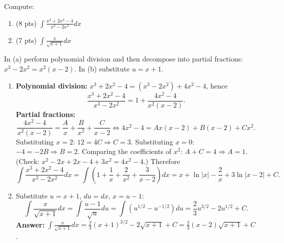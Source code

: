 
\begin{question}
Compute:
\begin{enumerate}
  \item[(a)] (8 pts) $\displaystyle\int\frac{x^3+2x^2-4}{x^3-2x^2}dx$
  \item[(b)] (7 pts) $\displaystyle\int\frac{x}{\sqrt{x+1}}dx$
\end{enumerate}
\end{question}

\begin{hint}
In (a) perform polynomial division and then decompose into partial fractions: $x^3-2x^2=x^2(x-2)$. In (b) substitute $u=x+1$.
\end{hint}

\begin{solution}
\begin{enumerate}
  \item[(a)] \textbf{Polynomial division:} $x^3+2x^2-4=(x^3-2x^2)+4x^2-4$, hence
  \[
  \frac{x^3+2x^2-4}{x^3-2x^2}=1+\frac{4x^2-4}{x^2(x-2)}.
  \]
  \textbf{Partial fractions:}
  \[
  \frac{4x^2-4}{x^2(x-2)}=\frac Ax+\frac B{x^2}+\frac C{x-2}\iff 4x^2-4=Ax(x-2)+B(x-2)+Cx^2.
  \]
  Substituting $x=2$: $12=4C\Rightarrow C=3$. Substituting $x=0$: $-4=-2B\Rightarrow B=2$. Comparing the coefficients of $x^2$: $A+C=4\Rightarrow A=1$.
  (Check: $x^2-2x+2x-4+3x^2=4x^2-4$.) Therefore
  \[
  \int\frac{x^3+2x^2-4}{x^3-2x^2}dx=\int\left(1+\frac1x+\frac2{x^2}+\frac3{x-2}\right)dx=x+\ln|x|-\frac2x+3\ln|x-2|+C.
  \]

  \item[(b)] Substitute $u=x+1$, $du=dx$, $x=u-1$:
  \[
  \int\frac{x}{\sqrt{x+1}}dx=\int\frac{u-1}{\sqrt u}du=\int\left(u^{1/2}-u^{-1/2}\right)du=\frac23u^{3/2}-2u^{1/2}+C.
  \]
  \textbf{Answer:} $\displaystyle\int\frac{x}{\sqrt{x+1}}dx=\frac23(x+1)^{3/2}-2\sqrt{x+1}+C=\frac23(x-2)\sqrt{x+1}+C$.
\end{enumerate}
\end{solution}
